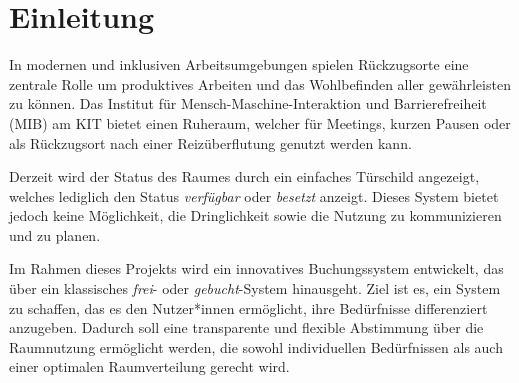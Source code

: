 \chapter{Einleitung}
In modernen und inklusiven Arbeitsumgebungen spielen Rückzugsorte eine zentrale Rolle um produktives Arbeiten und das Wohlbefinden aller gewährleisten zu können.
Das Institut für Mensch-Maschine-Interaktion und Barrierefreiheit (MIB) am KIT bietet einen Ruheraum, welcher für Meetings, kurzen Pausen oder als Rückzugsort nach einer Reizüberflutung genutzt werden kann.

Derzeit wird der Status des Raumes durch ein einfaches Türschild angezeigt, welches lediglich den Status \textit{verfügbar} oder \textit{besetzt} anzeigt.
Dieses System bietet jedoch keine Möglichkeit, die Dringlichkeit sowie die Nutzung zu kommunizieren und zu planen.

Im Rahmen dieses Projekts wird ein innovatives Buchungssystem entwickelt, das über ein klassisches \textit{frei}- oder \textit{gebucht}-System hinausgeht.
Ziel ist es, ein System zu schaffen, das es den Nutzer*innen ermöglicht, ihre Bedürfnisse differenziert anzugeben.
Dadurch soll eine transparente und flexible Abstimmung über die Raumnutzung ermöglicht werden, die sowohl individuellen Bedürfnissen als auch einer optimalen Raumverteilung gerecht wird.